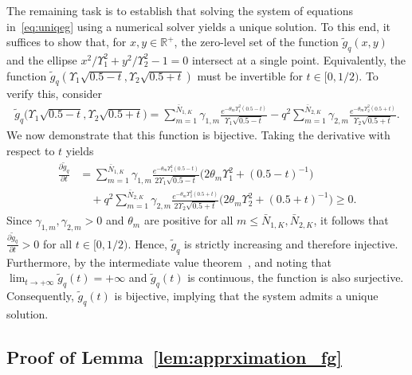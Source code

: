 \documentclass[journal,12pt,onecolumn,draftclsnofoot]{IEEEtran}
\theoremstyle{definition}
\begin{document}
The remaining task is to establish that solving the system of equations in~\eqref{eq:uniqeg} using a numerical solver yields a unique solution. 
To this end, it suffices to show that, for $x, y \in \mathbb{R}^{+}$, the zero-level set of the function $\tilde{g}_q(x,y)$ and the ellipse $x^2/\Upsilon_1^2 + y^2/\Upsilon_2^2 - 1 = 0$ intersect at a single point. 
Equivalently, the function $\tilde{g}_q(\Upsilon_1\sqrt{0.5 - t}, \Upsilon_2\sqrt{0.5 + t})$ must be invertible for $t \in [0, 1/2)$. 
To verify this, consider
\begin{align*} 
\tilde{g}_q\big(\Upsilon_1\sqrt{0.5 - t}, \Upsilon_2\sqrt{0.5 + t}\big) 
= \sum_{m=1}^{\bar{N}_{1,K}} \gamma_{1,m} 
  \frac{e^{-\theta_m \Upsilon_1^2 (0.5 - t)}}{\Upsilon_1 \sqrt{0.5 - t}} 
  - q^2 \sum_{m=1}^{\bar{N}_{2,K}} \gamma_{2,m} 
  \frac{e^{-\theta_m \Upsilon_2^2 (0.5 + t)}}{\Upsilon_2 \sqrt{0.5 + t}}.
\end{align*}
We now demonstrate that this function is bijective.  Taking the derivative with respect to $t$ yields
\begin{align}
  \nonumber
   \frac{\partial \tilde{g}_q}{\partial t} 
   &= \sum_{m=1}^{\bar{N}_{1,K}} \gamma_{1,m} 
   \frac{e^{-\theta_m \Upsilon_1^2 (0.5 - t)}}{2\Upsilon_1 \sqrt{0.5 - t}}
   \Big(2\theta_m \Upsilon_1^2 + (0.5 - t)^{-1}\Big) \\ 
   &\quad + q^2 \sum_{m=1}^{\bar{N}_{2,K}} \gamma_{2,m} 
   \frac{e^{-\theta_m \Upsilon_2^2 (0.5 + t)}}{2\Upsilon_2 \sqrt{0.5 + t}}
   \Big(2\theta_m \Upsilon_2^2 + (0.5 + t)^{-1}\Big) 
   \ge 0.
   \label{eq:Derivative}
\end{align}
Since $\gamma_{1,m}, \gamma_{2,m} > 0$ and $\theta_m$ are positive for all $m \leq \bar{N}_{1,K}, \bar{N}_{2,K}$, it follows that $\frac{\partial \tilde{g}_q}{\partial t} > 0$ for all $t \in [0, 1/2)$. 
Hence, $\tilde{g}_q$ is strictly increasing and therefore injective. 
Furthermore, by the intermediate value theorem~\cite{huang1992intermediate}, and noting that $\lim_{t \to +\infty} \tilde{g}_q(t) = +\infty$ and $\tilde{g}_q(t)$ is continuous, the function is also surjective. Consequently, $\tilde{g}_q(t)$ is bijective, implying that the system admits a unique solution.







\subsection{Proof of Lemma~\ref{lem:apprximation_fg}}\label{ap:apprximation_FGQ}
\end{document}
